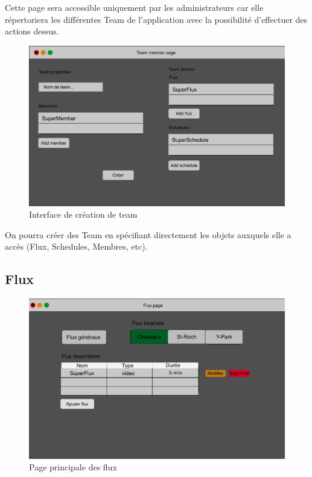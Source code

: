 \documentclass[french]{article}
\begin{document}
\begin{appendices}
	Cette page sera accessible uniquement par les administrateurs car elle répertoriera les différentes Team de l'application avec la possibilité d'effectuer des actions dessus.
	
	\begin{figure}[h]
		\centering
		\includegraphics[scale=0.3]{mockup/m_team_creation}
		\caption{Interface de création de team}
		\label{fig:teamCreation}
	\end{figure}
	
	On pourra créer des Team en spécifiant directement les objets auxquels elle a accès (Flux, Schedules, Membres, etc).

\newpage	
\subsection{Flux}

	\begin{figure}[h]
		\centering
		\includegraphics[scale=0.3]{mockup/m_flux_page}
		\caption{Page principale des flux}
		\label{fig:fluxPage}
	\end{figure}
	

\end{appendices}
\end{document}
